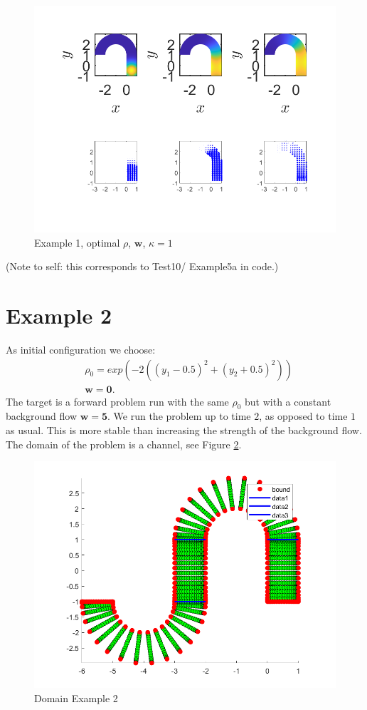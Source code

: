 \documentclass[11pt, a4paper]{article}
\theoremstyle{definition}
\newcommand{\w}{\mathbf{w}}
\begin{document}
\begin{figure}[h]
	\centering
	\includegraphics[scale=0.6]{Opt11.png}
	\caption{Example 1, optimal $\rho$, $\w$, $\kappa = 1$} 
	\label{FEx1d}
\end{figure}
(Note to self: this corresponds to Test10/ Example5a in code.)
\section{Example 2}
As initial configuration we choose:
\begin{align*}
&\rho_0 = exp(-2((y_1 - 0.5 )^2 + (y_2 + 0.5)^2))\\
&\w = \mathbf{0}.
\end{align*}	
The target is a forward problem run with the same $\rho_0$ but with a constant background flow $\w = \mathbf{5}$. We run the problem up to time $2$, as opposed to time $1$ as usual. This is more stable than increasing the strength of the background flow. The domain of the problem is a channel, see Figure \ref{Dom2}.
\begin{figure}[h]
	\centering
	\includegraphics[scale=0.6]{Dom2.png}
	\caption{Domain Example 2} 
	\label{Dom2}
\end{figure}
\end{document}
